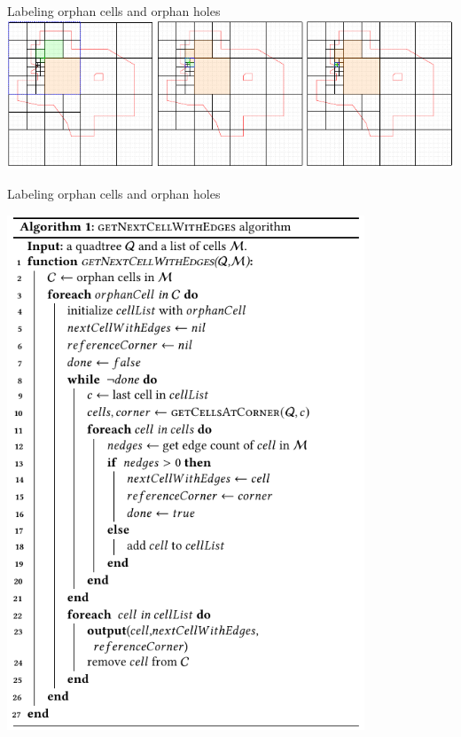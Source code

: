 \documentclass{beamer}
\begin{document}
    \begin{frame}{Labeling orphan cells and orphan holes}
        \centering
        \includegraphics[width=\textwidth]{figures/holes2}
    \end{frame}

    \begin{frame}{Labeling orphan cells and orphan holes}
        \begin{minipage}{0.49\textwidth}
            \centering
            \includegraphics[width=0.8\textwidth]{figures/holes3}
        \end{minipage}\hfill %
        \begin{minipage}{0.49\textwidth}
            \centering

\end{minipage}
\end{frame}
\end{document}
